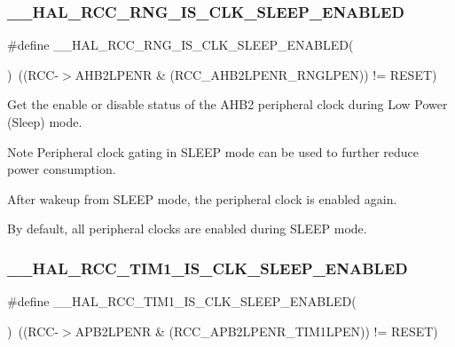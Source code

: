 \subsubsection{\texorpdfstring{\_\_HAL\_RCC\_RNG\_IS\_CLK\_SLEEP\_ENABLED}{\_\_HAL\_RCC\_RNG\_IS\_CLK\_SLEEP\_ENABLED}}
{\footnotesize\ttfamily \#define \+\_\+\+\_\+\+H\+A\+L\+\_\+\+R\+C\+C\+\_\+\+R\+N\+G\+\_\+\+I\+S\+\_\+\+C\+L\+K\+\_\+\+S\+L\+E\+E\+P\+\_\+\+E\+N\+A\+B\+L\+ED(\begin{DoxyParamCaption}{ }\end{DoxyParamCaption})~((R\+CC-\/$>$A\+H\+B2\+L\+P\+E\+NR \& (R\+C\+C\+\_\+\+A\+H\+B2\+L\+P\+E\+N\+R\+\_\+\+R\+N\+G\+L\+P\+EN)) != R\+E\+S\+ET)}



Get the enable or disable status of the A\+H\+B2 peripheral clock during Low Power (Sleep) mode. 

\begin{DoxyNote}{Note}
Peripheral clock gating in S\+L\+E\+EP mode can be used to further reduce power consumption. 

After wakeup from S\+L\+E\+EP mode, the peripheral clock is enabled again. 

By default, all peripheral clocks are enabled during S\+L\+E\+EP mode. 
\end{DoxyNote}
\mbox{\label{group___r_c_c___clock___sleep___enable___disable___status_ga0b265851c7557da6b372ff462819caa9}} 
\subsubsection{\texorpdfstring{\_\_HAL\_RCC\_TIM1\_IS\_CLK\_SLEEP\_ENABLED}{\_\_HAL\_RCC\_TIM1\_IS\_CLK\_SLEEP\_ENABLED}}
{\footnotesize\ttfamily \#define \+\_\+\+\_\+\+H\+A\+L\+\_\+\+R\+C\+C\+\_\+\+T\+I\+M1\+\_\+\+I\+S\+\_\+\+C\+L\+K\+\_\+\+S\+L\+E\+E\+P\+\_\+\+E\+N\+A\+B\+L\+ED(\begin{DoxyParamCaption}{ }\end{DoxyParamCaption})~((R\+CC-\/$>$A\+P\+B2\+L\+P\+E\+NR \& (R\+C\+C\+\_\+\+A\+P\+B2\+L\+P\+E\+N\+R\+\_\+\+T\+I\+M1\+L\+P\+EN)) != R\+E\+S\+ET)}



